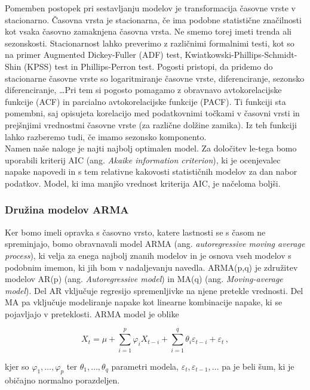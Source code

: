\documentclass[a4paper, 11pt]{article}
\begin{document}
\noindent Pomemben postopek pri sestavljanju modelov je transformacija časovne vrste v stacionarno.
Časovna vrsta je stacionarna, če ima podobne statistične značilnosti kot vsaka časovno zamaknjena časovna vrsta. 
Ne smemo torej imeti trenda ali sezonskosti.
Stacionarnost lahko preverimo z različnimi formalnimi testi, kot so na primer Augmented Dickey-Fuller (ADF) test,
Kwiatkowski-Phillips-Schmidt-Shin (KPSS) test in Phillips-Perron test.
Pogosti pristopi, da pridemo do stacionarne časovne vrste so logaritmiranje časovne vrste, diferenciranje,
sezonsko diferenciranje, \dots Pri tem si pogosto pomagamo z obravnavo 
avtokorelacijske funkcije (ACF) in parcialno avtokorelacijske funkcije (PACF). 
Ti funkciji sta pomembni, saj opisujeta korelacijo med podatkovnimi točkami v časovni vrsti in prejšnjimi vrednostmi 
časovne vrste (za različne dolžine zamika). Iz teh funkciji lahko razberemo tudi, če imamo sezonsko komponento.
\cite{Stacionarity_V,Brilej_2021} \\

\noindent Namen naše naloge je najti najbolj optimalen model. Za določitev le-tega bomo uporabili kriterij AIC (ang. \emph{Akaike information criterion}),
ki je ocenjevalec napake napovedi in s tem relativne kakovosti statističnih modelov za dan nabor podatkov.
Model, ki ima manjšo vrednost kriterija AIC, je načeloma boljši. 

\subsubsection{Družina modelov ARMA}

\noindent Ker bomo imeli opravka s časovno vrsto, katere lastnosti se s časom ne spreminjajo, bomo
obravnavali model ARMA (ang. \emph{autoregressive moving average process}), ki velja za enega najbolj znanih modelov 
in je osnova vseh modelov s podobnim imemon, ki jih bom v nadaljevanju navedla. 
ARMA(p,q) je združitev modelov AR(p) (ang. \emph{Autoregressive model}) in MA(q) (ang. \emph{Moving-average model}). 
Del AR vključuje regresijo spremenljivke na njene pretekle vrednosti. 
Del MA pa vključuje modeliranje napake kot linearne kombinacije napake, ki se pojavljajo v preteklosti.
ARMA model je oblike

\begin{equation}
    \label{ARIMA}
    X_t = \mu +  \sum_{i=1}^{p}{\varphi_i X_{t-i}} + \sum_{i=1}^{q}{\theta_i \varepsilon_{t-i}} + \varepsilon_t \,,
\end{equation}

\noindent kjer so $\varphi_1, \dots, \varphi_p$ ter $\theta_1, \dots, \theta_q$ parametri
modela, $\varepsilon_t, \varepsilon_{t-1}, \dots$ pa je beli šum, ki je običajno
normalno porazdeljen. \\
\end{document}

